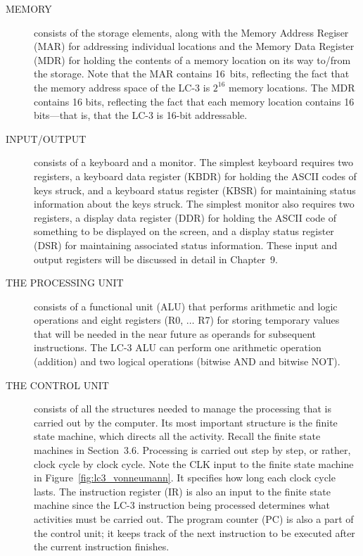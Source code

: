 \documentclass{patt}
\begin{document}
\begin{description}
\item[MEMORY] consists of the storage elements, along with the Memory Address
Regiser (MAR) for addressing individual locations and the Memory Data Register
(MDR) for holding the contents of a memory
location on its way to/from the storage.  Note that the MAR contains 16~bits,
reflecting the fact that the memory address space of the LC-3 is $2^{16}$
memory locations.  The MDR contains 16 bits, reflecting the fact that each
memory location contains 16 bits---that is, that the LC-3 is 16-bit addressable.

\item[INPUT/OUTPUT] consists of a keyboard and a monitor.  The
  simplest keyboard requires two registers, a keyboard data register (KBDR) for
  holding the ASCII codes of keys struck, and a keyboard status register (KBSR)
  for maintaining status information about the keys struck.  The
  simplest monitor also requires two registers, a display data register (DDR) 
  for holding the ASCII code of something to be displayed on the screen, and 
  a display status register (DSR) for maintaining associated status information.
  These input and output registers will be discussed in detail in Chapter~9.

\item[THE PROCESSING UNIT]
consists of a functional unit (ALU) that performs arithmetic
and logic operations and eight registers (R0, $\ldots$ R7) for storing
temporary values that will be needed in the near future as operands for
\nobreak subsequent instructions.  The LC-3 ALU can perform one arithmetic 
operation (addition) and two logical operations (bitwise AND and bitwise 
NOT).

\item[THE CONTROL UNIT] consists of all the structures 
needed to\enlargethispage*{6pt}
  manage the processing that is carried out by the computer.  Its most
  important structure is the finite state machine, which directs all
  the activity.  Recall the finite state machines in Section~3.6.
  Processing is carried out step by step, or rather, clock cycle by
  clock cycle.  Note the CLK input to the finite state machine in
  Figure~\ref{fig:lc3_vonneumann}.
  It specifies how long each clock cycle lasts.  The
  instruction register (IR) is also an input to the finite state
  machine since the LC-3 instruction being processed determines
  what activities must be carried out.  The program counter (PC) is
  also a part of the control unit; it keeps track of the next
  instruction to be executed after the current instruction finishes.
\end{description}
\end{document}
